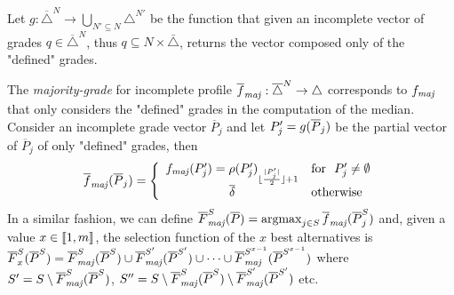 
Let $g:\overline{\triangle}^N\rightarrow \bigcup_{N' \subseteq N}\triangle^{N'}$ be the function that given an incomplete vector of grades $q \in \overline{\triangle}^N$, thus $q \subseteq N × \bar{\triangle}$, returns the vector composed only of the "defined" grades. 


The \emph{majority-grade} for incomplete profile $\fmajbar: \overline{\triangle}^N \rightarrow \triangle$ corresponds to $\fmaj$ that only considers the "defined" grades in the computation of the median. Consider an incomplete grade vector $\overline{P}_j$ and let $P'_j=g(\overline{P}_j)$ be the partial vector of $\overline{P}_j$ of only "defined" grades, then \[\fmajbar(\Pbar_j)= \left\{ \begin{array}{cl}
	\fmaj(P'_j) =  \rho(P'_j)_{\floor{\frac{\card{P'_j}}{2}} + 1} & \mbox{for } \
	 P'_j \neq \emptyset  \\  \dbar & \mbox{otherwise}
\end{array}\right.
\]
\commentOC{Seems all right to me.}
In a similar fashion, we can define $\Fmajbar[S](\Pbar)=\argmax_{j\in S}\fmajbar(\Pbar^S_j)$ and, given a value $x\in \llbracket1,m\rrbracket$, the selection function of the $x$ best alternatives is $\overline{F}^S_x(\Pbar^S) = \Fmajbar[S](\Pbar^S) \cup \Fmajbar[S'](\Pbar^{S'}) \cup \dots \cup \Fmajbar[S^{x-1}](\Pbar^{S^{x-1}})$ where $S'= S \setminus \Fmajbar[S](\Pbar^{S})$, $S''= S \setminus \Fmajbar[S](\Pbar^S) \setminus \Fmajbar[S'](\Pbar^{S'})$ etc.

